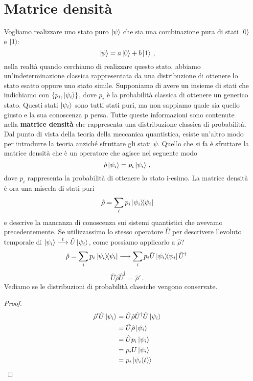 \section{Matrice densità}
Vogliamo realizzare uno stato puro $\ket \psi$ che sia una combinazione pura di stati $\ket 0$ e $\ket 1$:
\begin{equation*}
    \ket \psi = a\ket 0 + b \ket 1\, ,
\end{equation*}
nella realtà quando cerchiamo di realizzare questo stato, abbiamo un'indeterminazione classica rappresentata da una distribuzione di ottenere lo stato esatto oppure uno stato simile. Supponiamo di avere un insieme di stati che indichiamo con $\{p_i, \ket{\psi_i}\}$, dove $p_i$ è la probabilità classica di ottenere un generico stato. Questi stati $\ket{\psi_i}$ sono tutti stati puri, ma non sappiamo quale sia quello giusto e la sua conoscenza p persa. Tutte queste informazioni sono contenute nella \textbf{matrice densità} che rappresenta una distribuzione classica di probabilità.\\
Dal punto di vista della teoria della meccanica quantistica, esiste un'altro modo per introdurre la teoria anziché sfruttare gli stati $\psi$. Quello che si fa è sfruttare la matrice densità che è un operatore che agisce nel seguente modo
\begin{equation*}
    \hat \rho \ket{\psi_i}=p_i\ket{\psi_i}\, ,
\end{equation*}
dove $p_i$ rappresenta la probabilità di ottenere lo stato i-esimo. La matrice densità è ora una miscela di stati puri
\begin{equation*}
    \hat \rho = \sum_i p_i \op{\psi_i}{\psi_i}
\end{equation*}
e descrive la mancanza di conoscenza sui sistemi quantistici che avevamo precedentemente. Se utilizzassimo lo stesso operatore $\hat U$ per descrivere l'evoluto temporale di $\ket{\psi_i} \overset{t}{\longrightarrow} \hat U\ket{\psi_i}$, come possiamo applicarlo a $\hat \rho$?
\begin{equation*}
    \hat \rho = \sum_i p_i \op{\psi_i}{\psi_i} \longrightarrow \sum_i p_i \hat U\op{\psi_i}{\psi_i}\hat U^\dagger \,
\end{equation*}
\begin{equation*}
    \hat U \hat \rho \hat U^\dagger = \hat \rho ' \, .
\end{equation*}
Vediamo se le distribuzioni di probabilità classiche vengono conservate.
\begin{proof}
    \begin{equation*}
        \begin{aligned}
            \hat \rho' \hat U \ket{\psi_i} &=\hat U \hat \rho \hat U^\dagger \hat U \ket{\psi_i} \\
                                           &=\hat U \hat \rho \ket{\psi_i} \\
                                           &=\hat U p_i \ket{\psi_i} \\
                                           &=p_i U \ket{\psi_i} \\
                                           &=p_i\ket{\psi_i(t)}
        \end{aligned}
    \end{equation*}
\end{proof}